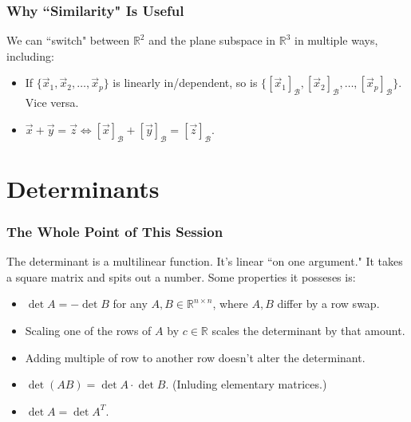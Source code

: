 \documentclass{beamer}
\begin{document}
\begin{frame}
\frametitle{Why ``Similarity" Is Useful}
We can ``switch" between \(\mathbb{R}^2\) and the plane subspace in \(\mathbb{R}^3\) in multiple ways, including:
\begin{itemize}
\item If \(\{\vec{x}_1, \vec{x}_2, \dots, \vec{x}_p\}\) is linearly in/dependent, so is \(\{[\vec{x}_1]_{\mathcal{B}}, [\vec{x}_2]_{\mathcal{B}}, \dots, [\vec{x}_p]_{\mathcal{B}}\}\).
	Vice versa.
\item \(\vec{x} + \vec{y} = \vec{z} \iff [\vec{x}]_{\mathcal{B}} + [\vec{y}]_{\mathcal{B}} = [\vec{z}]_{\mathcal{B}}.\)
\end{itemize}
\end{frame}

\section{Determinants}
\begin{frame}
	\frametitle{The Whole Point of This Session}
	The determinant is a multilinear function. It's linear ``on one argument." It takes a square matrix and spits out a number. Some properties it posseses is: \pause
	\begin{itemize}
		\item \(\det A = -\det B\) for any \(A, B \in \mathbb{R}^{n \times n}\), where \(A, B\) differ by a row swap. \pause
		\item Scaling one of the rows of \(A\) by \(c \in \mathbb{R}\) scales the determinant by that amount. \pause
		\item Adding multiple of row to another row doesn't alter the determinant. \pause
		\item \(\det(AB) = \det A \cdot \det B.\) (Inluding elementary matrices.) \pause
		\item \(\det A = \det A^T\).
	\end{itemize}
\end{frame}
 
\end{document}
